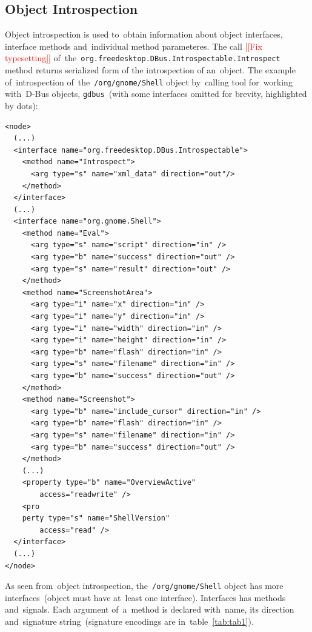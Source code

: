 \documentclass[conference]{IEEEtran}
\newcommand{\addtodo}[1]{\textcolor{red}{[[#1]]}}
\begin{document}
\subsection{Object Introspection}

Object introspection is used to~obtain information about object interfaces,
interface methods and~individual method parameteres. The call \addtodo{Fix
typesetting} of~the~\texttt{org.freedesktop.DBus.Introspectable.Introspect}
method returns serialized form of the introspection of an~object. The example of~introspection
of~the~\texttt{/org/gnome/Shell} object by~calling tool for~working with~D-Bus
objects, \texttt{gdbus}~(with some interfaces omitted for brevity, highlighted
by dots):
{\scriptsize
\begin{verbatim}
<node>
  (...)
  <interface name="org.freedesktop.DBus.Introspectable">
    <method name="Introspect">
      <arg type="s" name="xml_data" direction="out"/>
    </method>
  </interface>
  (...)
  <interface name="org.gnome.Shell">
    <method name="Eval">
      <arg type="s" name="script" direction="in" />
      <arg type="b" name="success" direction="out" />
      <arg type="s" name="result" direction="out" />
    </method>
    <method name="ScreenshotArea">
      <arg type="i" name="x" direction="in" />
      <arg type="i" name="y" direction="in" />
      <arg type="i" name="width" direction="in" />
      <arg type="i" name="height" direction="in" />
      <arg type="b" name="flash" direction="in" />
      <arg type="s" name="filename" direction="in" />
      <arg type="b" name="success" direction="out" />
    </method>
    <method name="Screenshot">
      <arg type="b" name="include_cursor" direction="in" />
      <arg type="b" name="flash" direction="in" />
      <arg type="s" name="filename" direction="in" />
      <arg type="b" name="success" direction="out" />
    </method>
    (...)
    <property type="b" name="OverviewActive"
        access="readwrite" />
    <pro
    perty type="s" name="ShellVersion"
        access="read" />
  </interface>
  (...)
</node>
\end{verbatim}
}

As seen from~object introspection, the~\texttt{/org/gnome/Shell} object has more
interfaces~(object must have at~least one interface). Interfaces has methods
and~signals. Each argument of~a~method is declared with~name, its direction
and~signature string~(signature encodings are in~table~\ref{tab:tab1}).


\end{document}
